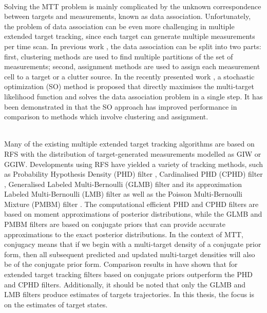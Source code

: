~\\
Solving the MTT problem is mainly complicated by the unknown correspondence between targets and measurements, known as data association. Unfortunately, the problem of data association can be even more challenging in multiple extended target tracking, since each target can generate multiple measurements per time scan. In previous work \cite{phdextended,pmbmextended,pmbmextended2}, the data association can be split into two parts: first, clustering methods are used to find multiple partitions of the set of measurements; second, assignment methods are used to assign each measurement cell to a target or a clutter source. In the recently presented work \cite{soextended}, a stochastic optimization (SO) method is proposed that directly maximises the multi-target likelihood function and solves the data association problem in a single step. It has been demonstrated in \cite{soextended} that the SO approach has improved performance in comparison to methods which involve clustering and assignment. 

~\\
Many of the existing multiple extended target tracking algorithms are based on RFS with the distribution of target-generated measurements modelled as GIW or GGIW. Developments using RFS have yielded a variety of tracking methods, such as Probability Hypothesis Density (PHD) filter \cite{phdextended2,phdextended3}, Cardinalised PHD (CPHD) filter \cite{cphdextended}, Generalised Labeled Multi-Bernoulli (GLMB) filter \cite{lmbextended} and its approximation Labeled Multi-Bernoulli (LMB) filter \cite{lmbextended} as well as the Poisson Multi-Bernoulli Mixture (PMBM) filter \cite{pmbmextended,pmbmextended2}. The computational efficient PHD and CPHD filters are based on moment approximations of posterior distributions, while the GLMB and PMBM filters are based on conjugate priors that can provide accurate approximations to the exact posterior distributions. In the context of MTT, conjugacy means that if we begin with a multi-target density of a conjugate prior form, then all subsequent predicted and updated multi-target densities will also be of the conjugate prior form. Comparison results in \cite{pmbmextended,lmbextended} have shown that for extended target tracking filters based on conjugate priors outperform the PHD and CPHD filters. Additionally, it should be noted that only the GLMB and LMB filters produce estimates of targets trajectories. In this thesis, the focus is on the estimates of target states.

